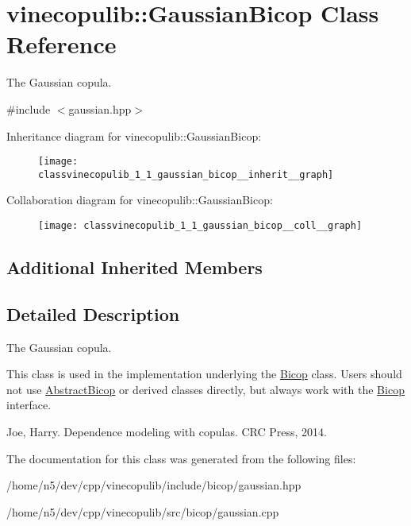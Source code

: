 \hypertarget{classvinecopulib_1_1_gaussian_bicop}{}\section{vinecopulib\+:\+:Gaussian\+Bicop Class Reference}
\label{classvinecopulib_1_1_gaussian_bicop}


The Gaussian copula.  




{\ttfamily \#include $<$gaussian.\+hpp$>$}



Inheritance diagram for vinecopulib\+:\+:Gaussian\+Bicop\+:\nopagebreak
\begin{figure}[H]
\begin{center}
\leavevmode
\texttt{[image: classvinecopulib\_1\_1\_gaussian\_bicop\_\_inherit\_\_graph]}
\end{center}
\end{figure}


Collaboration diagram for vinecopulib\+:\+:Gaussian\+Bicop\+:\nopagebreak
\begin{figure}[H]
\begin{center}
\leavevmode
\texttt{[image: classvinecopulib\_1\_1\_gaussian\_bicop\_\_coll\_\_graph]}
\end{center}
\end{figure}
\subsection*{Additional Inherited Members}


\subsection{Detailed Description}
The Gaussian copula. 

This class is used in the implementation underlying the \hyperlink{classvinecopulib_1_1_bicop}{Bicop} class. Users should not use \hyperlink{classvinecopulib_1_1_abstract_bicop}{Abstract\+Bicop} or derived classes directly, but always work with the \hyperlink{classvinecopulib_1_1_bicop}{Bicop} interface.

Joe, Harry. Dependence modeling with copulas. C\+RC Press, 2014. 

The documentation for this class was generated from the following files\+:\begin{DoxyCompactItemize}
\item 
/home/n5/dev/cpp/vinecopulib/include/bicop/gaussian.\+hpp\item 
/home/n5/dev/cpp/vinecopulib/src/bicop/gaussian.\+cpp\end{DoxyCompactItemize}
